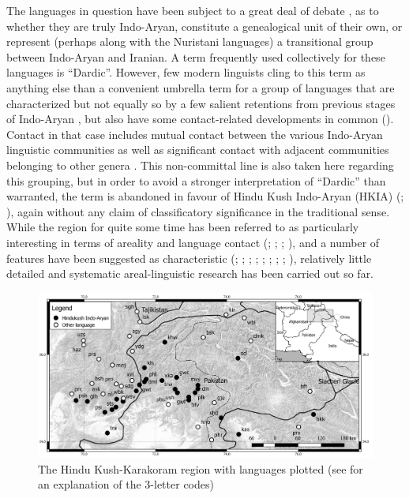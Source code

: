\documentclass[output=collectionpaper]{langsci/langscibook}
\begin{document}
The languages in question have been subject to a great deal of debate \citep[251]{Strand2001}, as to whether they are truly Indo-Aryan, constitute a genealogical unit of their own, or represent (perhaps along with the Nuristani languages) a transitional group between Indo-Aryan and Iranian. A term frequently used collectively for these languages is ``Dardic''. However, few modern linguists cling to this term as anything else than a convenient umbrella term for a group of languages that are characterized \textendash{} but not equally so \textendash{} by a few salient retentions from previous stages of Indo-Aryan \citep[3]{Morgenstierne1974}, but also have some contact-related developments in common (\citealt[821--822]{Bashir2003}). Contact in that case includes mutual contact between the various Indo-Aryan linguistic communities as well as significant contact with adjacent communities belonging to other genera \citep{Liljegren2017}. This non-committal line is also taken here regarding this grouping, but in order to avoid a stronger interpretation of ``Dardic'' than warranted, the term is  abandoned in favour of Hindu Kush Indo-Aryan (HKIA) (\citealt[135]{Liljegren2014}; \citealt[23]{HeegardPetersen2015}), again without any claim of classificatory significance in the traditional sense. While the region for quite some time has been referred to as particularly interesting in terms of areality and language contact (\citealt{Emeneau1965}; \citealt{Skalmowski1985}; \citealt[43]{Masica1991}; \citealt[259]{Masica2001}), and a number of features have been suggested as characteristic (\citealt[392--420]{Bashir1988}; \citealt{Bashir1996}; \citealt[821--823]{Bashir2003}; \citealt{Edelman1980}; \citealt[35--59]{Edelman1983}; \citealt[389--399]{Fussman1972}; \citealt{Tikkanen1999,Tikkanen2008}; \citealt{Baart2014}; \citealt{Toporov1970}), relatively little detailed and systematic areal-linguistic research has been carried out so far.

\begin{figure}
\includegraphics[width=\textwidth]{figures/10/map1}
\caption{The Hindu Kush-Karakoram region with languages plotted (see  for an explanation of the 3-letter codes)}
\label{fig:Lilje:1}
\end{figure}
\end{document}
